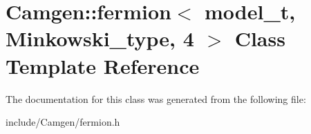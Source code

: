 \hypertarget{a00218}{\section{Camgen\-:\-:fermion$<$ model\-\_\-t, Minkowski\-\_\-type, 4 $>$ Class Template Reference}
\label{a00218}
}


The documentation for this class was generated from the following file\-:\begin{DoxyCompactItemize}
\item 
include/\-Camgen/fermion.\-h\end{DoxyCompactItemize}
